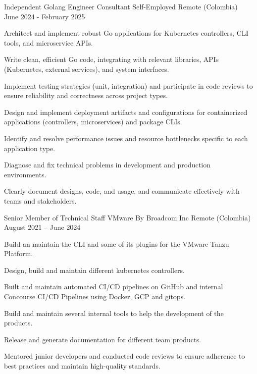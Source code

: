 \begin{cventries}
\cventry
{Independent Golang Engineer Consultant} %
{Self-Employed} %
{Remote (Colombia)} %
{June 2024 - February 2025} %
{
  \begin{cvitems} %
    \item {Architect and implement robust Go applications for Kubernetes controllers, CLI tools, and microservice APIs.}
    \item {Write clean, efficient Go code, integrating with relevant libraries, APIs (Kubernetes, external services), and system interfaces.}
    \item {Implement testing strategies (unit, integration) and participate in code reviews to ensure reliability and correctness across project types.}
    \item {Design and implement deployment artifacts and configurations for containerized applications (controllers, microservices) and package CLIs.}
    \item {Identify and resolve performance issues and resource bottlenecks specific to each application type.}
    \item {Diagnose and fix technical problems in development and production environments.}
    \item {Clearly document designs, code, and usage, and communicate effectively with teams and stakeholders.}
  \end{cvitems}
}
  \cventry
    {Senior Member of Technical Staff} %
    {VMware By Broadcom Inc} %
    {Remote (Colombia)} %
    {August 2021 – June 2024 } %
    {
      \begin{cvitems} %
        \item {Build an maintain the CLI and some of its plugins for the VMware Tanzu Platform.}
        \item {Design, build and maintain different kubernetes controllers.}
        \item {Built and maintain automated CI/CD pipelines on GitHub and internal Concourse CI/CD Pipelines using Docker, GCP and gitops.}
        \item {Build and maintain several internal tools to help the development of the products.}
        \item {Release and generate documentation for different team products.}
        \item {Mentored junior developers and conducted code reviews to ensure adherence to best practices and maintain high‐quality standards.}
      \end{cvitems}
    }


\end{cventries}
